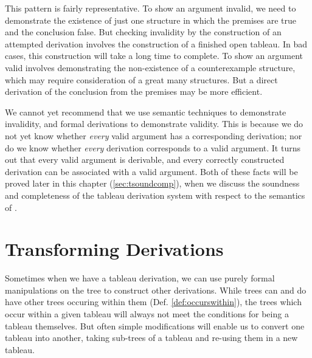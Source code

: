 This pattern is fairly representative. To show an argument invalid, we need to demonstrate the existence of just one structure in which the premises are true and the conclusion false. But checking invalidity by the construction of an attempted derivation involves the construction of a finished open tableau. In bad cases, this construction will take a long time to complete. To show an argument valid involves demonstrating the non-existence of a counterexample structure, which may require consideration of a great many structures. But a direct derivation of the conclusion from the premises may be more efficient.

We cannot yet recommend that we use semantic techniques to demonstrate invalidity, and formal derivations to demonstrate validity. This is because we do not yet know whether \emph{every} valid argument has a corresponding derivation; nor do we know whether \emph{every} derivation corresponds to a valid argument. It turns out that every valid argument is derivable, and every correctly constructed derivation can be associated with a valid argument. Both of these facts will be proved later in this chapter (\autoref{sec:tsoundcomp}), when we discuss the soundness and completeness of the tableau derivation system with respect to the semantics of \lone. 


\section{Transforming Derivations} %

Sometimes when we have a tableau derivation, we can use purely formal manipulations on the tree to construct other derivations. While trees can and do have other trees occuring within them (Def. \ref{def:occurswithin}), the trees which occur within a given tableau will always not meet the conditions for being a tableau themselves. But often simple modifications will enable us to convert one tableau into another, taking sub-trees of a tableau and re-using them in a new tableau. 

